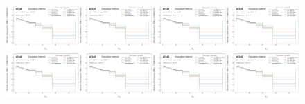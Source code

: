 \begin{figure}[h!]
\centering
\includegraphics[width=0.25\textwidth,page=1]{figures/SimResults/MultiFold_Lepton_SystEffect.pdf}\includegraphics[width=0.25\textwidth,page=2]{figures/SimResults/MultiFold_Lepton_SystEffect.pdf}\includegraphics[width=0.25\textwidth,page=3]{figures/SimResults/MultiFold_Lepton_SystEffect.pdf}\includegraphics[width=0.25\textwidth,page=4]{figures/SimResults/MultiFold_Lepton_SystEffect.pdf}\\
\includegraphics[width=0.25\textwidth,page=5]{figures/SimResults/MultiFold_Lepton_SystEffect.pdf}\includegraphics[width=0.25\textwidth,page=7]{figures/SimResults/MultiFold_Lepton_SystEffect.pdf}\includegraphics[width=0.25\textwidth,page=7]{figures/SimResults/MultiFold_Lepton_SystEffect.pdf}\includegraphics[width=0.25\textwidth,page=8]{figures/SimResults/MultiFold_Lepton_SystEffect.pdf}\\

\end{figure}

